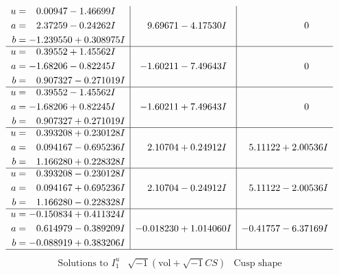\documentclass[1p]{elsarticle_modified}
\theoremstyle{definition}
\newcommand{\I}{\sqrt{-1}}
\begin{document}
$$\begin{array}{c|c|c}
\begin{aligned}
u &= \phantom{-}0.00947 - 1.46699 I \\
a &= \phantom{-}2.37259 - 0.24262 I \\
b &= -1.239550 + 0.308975 I\end{aligned}
 & \phantom{-}9.69671 - 4.17530 I & \phantom{-0.000000 } 0 \\ \hline\begin{aligned}
u &= \phantom{-}0.39552 + 1.45562 I \\
a &= -1.68206 - 0.82245 I \\
b &= \phantom{-}0.907327 - 0.271019 I\end{aligned}
 & -1.60211 - 7.49643 I & \phantom{-0.000000 } 0 \\ \hline\begin{aligned}
u &= \phantom{-}0.39552 - 1.45562 I \\
a &= -1.68206 + 0.82245 I \\
b &= \phantom{-}0.907327 + 0.271019 I\end{aligned}
 & -1.60211 + 7.49643 I & \phantom{-0.000000 } 0 \\ \hline\begin{aligned}
u &= \phantom{-}0.393208 + 0.230128 I \\
a &= \phantom{-}0.094167 - 0.695236 I \\
b &= \phantom{-}1.166280 + 0.228328 I\end{aligned}
 & \phantom{-}2.10704 + 0.24912 I & \phantom{-}5.11122 + 2.00536 I \\ \hline\begin{aligned}
u &= \phantom{-}0.393208 - 0.230128 I \\
a &= \phantom{-}0.094167 + 0.695236 I \\
b &= \phantom{-}1.166280 - 0.228328 I\end{aligned}
 & \phantom{-}2.10704 - 0.24912 I & \phantom{-}5.11122 - 2.00536 I \\ \hline\begin{aligned}
u &= -0.150834 + 0.411324 I \\
a &= \phantom{-}0.614979 - 0.389209 I \\
b &= -0.088919 + 0.383206 I\end{aligned}
 & -0.018230 + 1.014060 I & -0.41757 - 6.37169 I\\
 \hline 
 \end{array}$$\newpage$$\begin{array}{c|c|c}  
\text{Solutions to }I^u_{1}& \I (\text{vol} + \sqrt{-1}CS) & \text{Cusp shape}\\

\end{array}$$
\end{document}
